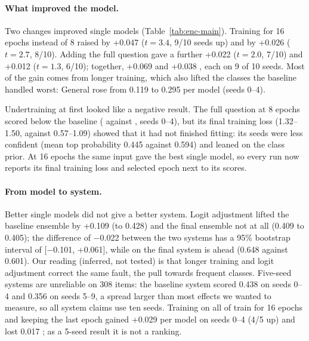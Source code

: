 \paragraph{What improved the model.}
Two changes improved single models (Table~\ref{tab:enc-main}). Training for 16 epochs instead of 8 raised \Stwo{} by
+0.047 ($t=3.4$, 9/10 seeds up) and \Sone{} by +0.026 ($t=2.7$, 8/10). Adding the full
question gave a further +0.022 \Stwo{} ($t=2.0$, 7/10) and +0.012 \Sone{} ($t=1.3$,
6/10); together, +0.069 \Stwo{} and +0.038 \Sone{}, each on 9 of 10 seeds. Most of the
gain comes from longer training, which also lifted the classes the baseline handled
worst: General rose from 0.119 to 0.295 per model (seeds 0--4).

Undertraining at first looked like a negative result. The full question at 8 epochs
scored below the baseline ( against , seeds 0--4),
but its final training loss (1.32--1.50, against 0.57--1.09) showed that it had not
finished fitting: its seeds were less confident (mean top probability 0.445 against
0.594) and leaned on the class prior. At 16 epochs the same input gave the best single
model, so every run now reports its final training loss and selected epoch next to its
scores.

\paragraph{From model to system.}
Better single models did not give a better \Stwo{} system. Logit adjustment lifted the
baseline ensemble by +0.109 (to 0.428) and the final ensemble not at all (0.409 to
0.405); the \Stwo{} difference of $-$0.022 between the two systems has a 95\% bootstrap
interval of [$-$0.101, +0.061], while on \Sone{} the final system is ahead (0.648 against
0.601). Our reading (inferred, not tested) is that longer training and logit adjustment
correct the same fault, the pull towards frequent classes. Five-seed systems are
unreliable on 308 items: the baseline system scored 0.438 on seeds 0--4 and 0.356 on
seeds 5--9, a spread larger than most effects we wanted to measure, so all system claims
use ten seeds. Training on all of train for 16 epochs and keeping the last epoch gained
+0.029 \Stwo{} per model on seeds 0--4 (4/5 up) and lost 0.017 \Sone{}; as a 5-seed
result it is not a ranking.

